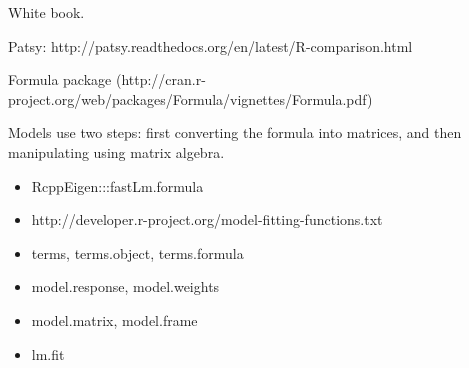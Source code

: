 White book.

Patsy: http://patsy.readthedocs.org/en/latest/R-comparison.html

Formula package
(http://cran.r-project.org/web/packages/Formula/vignettes/Formula.pdf)

Models use two steps: first converting the formula into matrices, and
then manipulating using matrix algebra.

\begin{itemize}
\item
  RcppEigen:::fastLm.formula
\item
  http://developer.r-project.org/model-fitting-functions.txt
\item
  terms, terms.object, terms.formula
\item
  model.response, model.weights
\item
  model.matrix, model.frame
\item
  lm.fit
\end{itemize}
